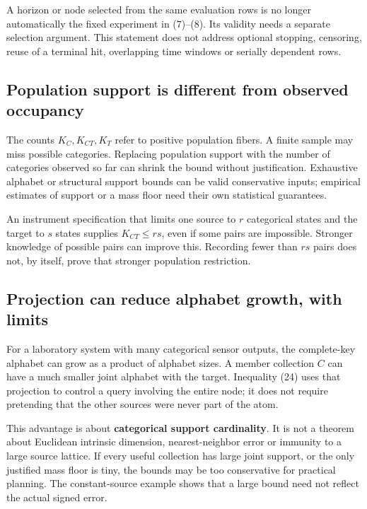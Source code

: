 \documentclass[11pt,a4paper]{article}
\begin{document}
A horizon or node selected from the same evaluation rows is no longer automatically the fixed experiment in (7)--(8). Its validity needs a separate selection argument. This statement does not address optional stopping, censoring, reuse of a terminal hit, overlapping time windows or serially dependent rows.

\subsection{Population support is different from observed occupancy}\label{population-support-is-different-from-observed-occupancy}

The counts \(K_C,K_{CT},K_T\) refer to positive population fibers. A finite sample may miss possible categories. Replacing population support with the number of categories observed so far can shrink the bound without justification. Exhaustive alphabet or structural support bounds can be valid conservative inputs; empirical estimates of support or a mass floor need their own statistical guarantees.

An instrument specification that limits one source to \(r\) categorical states and the target to \(s\) states supplies \(K_{CT}\le rs\), even if some pairs are impossible. Stronger knowledge of possible pairs can improve this. Recording fewer than \(rs\) pairs does not, by itself, prove that stronger population restriction.

\subsection{Projection can reduce alphabet growth, with limits}\label{projection-can-reduce-alphabet-growth-with-limits}

For a laboratory system with many categorical sensor outputs, the complete-key alphabet can grow as a product of alphabet sizes. A member collection \(C\) can have a much smaller joint alphabet with the target. Inequality (24) uses that projection to control a query involving the entire node; it does not require pretending that the other sources were never part of the atom.

This advantage is about \textbf{categorical support cardinality}. It is not a theorem about Euclidean intrinsic dimension, nearest-neighbor error or immunity to a large source lattice. If every useful collection has large joint support, or the only justified mass floor is tiny, the bounds may be too conservative for practical planning. The constant-source example shows that a large bound need not reflect the actual signed error.
\end{document}
